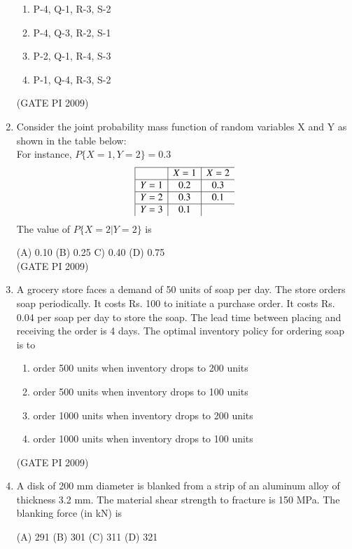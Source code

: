 \documentclass[journal,12pt,onecolumn]{IEEEtran}
\theoremstyle{remark}
\begin{document}
\begin{enumerate}[label=Q.\arabic*, leftmargin=*]
\begin{multicols}{2}
\begin{enumerate}[label=(\Alph*)]
    \item P-4, Q-1, R-3, S-2
    \item P-4, Q-3, R-2, S-1
    \item P-2, Q-1, R-4, S-3
    \item P-1, Q-4, R-3, S-2
\end{enumerate}
\end{multicols}
\hfill (GATE PI 2009)
\item Consider the joint probability mass function of random variables X and Y as shown in the table below: \\
For instance, $P\{X=1, Y=2\} = 0.3$
$$
\begin{array}{|c|c|c}
\hline
& X=1 & X=2 \\ \hline
Y=1 & 0.2 & 0.3 \\ \hline
Y=2 & 0.3 & 0.1 \\  \hline
Y=3 & 0.1 & \\
\end{array}
$$
The value of $P\{X=2|Y=2\}$ is

(A) 0.10 \hfill (B) 0.25 \hfill C) 0.40 \hfill (D) 0.75 \\

\hfill (GATE PI 2009)
\item A grocery store faces a demand of 50 units of soap per day. The store orders soap periodically. It costs Rs. 100 to initiate a purchase order. It costs Rs. 0.04 per soap per day to store the soap. The lead time between placing and receiving the order is 4 days. The optimal inventory policy for ordering soap is to
\begin{enumerate}[label=(\Alph*)]
\item order 500 units when inventory drops to 200 units 
\item order 500 units when inventory drops to 100 units
\item order 1000 units when inventory drops to 200 units
\item order 1000 units when inventory drops to 100 units
\end{enumerate}
\hfill (GATE PI 2009)
\item A disk of 200 mm diameter is blanked from a strip of an aluminum alloy of thickness 3.2 mm. The material shear strength to fracture is 150 MPa. The blanking force (in kN) is

(A) 291 \hfill (B) 301 \hfill(C) 311 \hfill (D) 321  \\


\end{enumerate}
\end{document}
